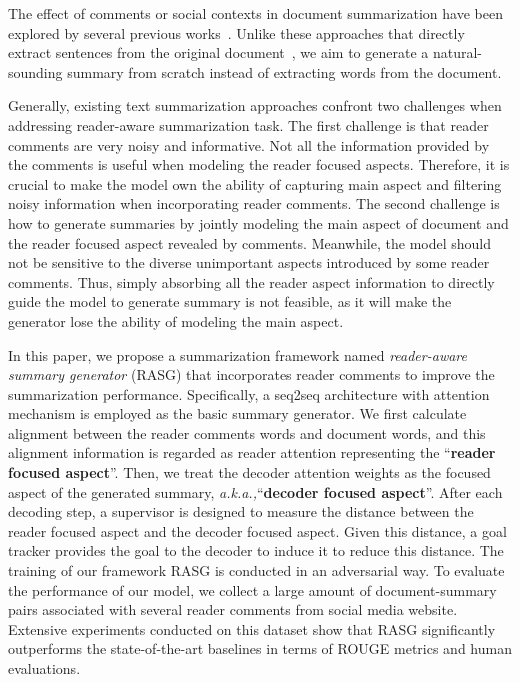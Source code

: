 \documentclass[letterpaper]{article}
\newcommand{\aka}{\emph{a.k.a.,}\xspace}
\begin{document}
The effect of comments or social contexts in document summarization have been explored by several previous works~\cite{Hu2008CommentsorientedDS,Yang2011SocialCS,Li2015ReaderAwareMS,li2017reader}.
Unlike these approaches that directly extract sentences from the original document~\cite{Hu2008CommentsorientedDS,Yang2011SocialCS,Li2015ReaderAwareMS}, we aim to generate a natural-sounding summary from scratch instead of extracting words from the document.

Generally, existing text summarization approaches confront two challenges when addressing reader-aware summarization task.
The first challenge is that reader comments are very noisy and informative.
Not all the information provided by the comments is useful when modeling the reader focused aspects.
Therefore, it is crucial to make the model own the ability of capturing main aspect and filtering noisy information when incorporating reader comments.
The second challenge is how to generate summaries by jointly modeling the main aspect of document and the reader focused aspect revealed by comments.
Meanwhile, the model should not be sensitive to the diverse unimportant aspects introduced by some reader comments.
Thus, simply absorbing all the reader aspect information to directly guide the model to generate summary is not feasible, as it will make the generator lose the ability of modeling the main aspect.


In this paper, we propose a summarization framework named \emph{reader-aware summary generator} (RASG) that incorporates reader comments to improve the summarization performance.
Specifically, a seq2seq architecture with attention mechanism is employed as the basic summary generator.
We first calculate alignment between the reader comments words and document words, and this alignment information is regarded as reader attention representing the ``\textbf{reader focused aspect}''.
Then, we treat the decoder attention weights as the focused aspect of the generated summary, \aka ``\textbf{decoder focused aspect}''.
After each decoding step, a supervisor is designed to measure the distance between the reader focused aspect and the decoder focused aspect.
Given this distance, a goal tracker provides the goal to the decoder to induce it to reduce this distance.
The training of our framework RASG is conducted in an adversarial way.
To evaluate the performance of our model, we collect a large amount of document-summary pairs associated with several reader comments from social media website.
Extensive experiments conducted on this dataset show that RASG significantly outperforms the state-of-the-art baselines in terms of ROUGE metrics and human evaluations.
\end{document}
